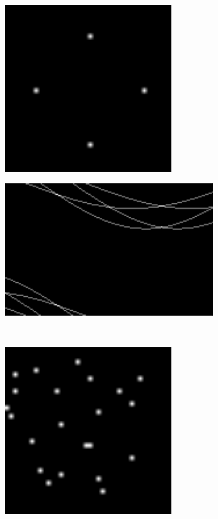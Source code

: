 \documentclass[12pt
,headinclude
,headsepline
,bibtotocnumbered
]{scrartcl}
\begin{document}
\begin{figure}[H]
\begin{subfigure}{0.45\textwidth}
        \includegraphics[width=0.8\textwidth]{plots/test2.png}
    \end{subfigure}
    \hfill
    \begin{subfigure}{0.45\textwidth}
        \includegraphics[width=1.25\textwidth]{plots/test2_hough.png}
    \end{subfigure}
    \\
    \begin{subfigure}{0.45\textwidth}
        \includegraphics[width=0.8\textwidth]{plots/test3.png}

\end{subfigure}
\end{figure}
\end{document}
